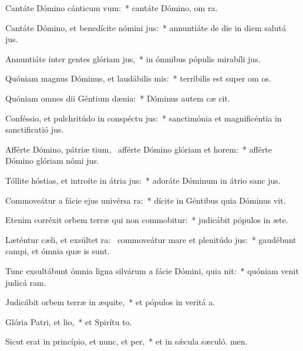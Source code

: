 \item Cantáte Dómino cánticum vum:~* cantáte Dómino, om ra.
\item Cantáte Dómino, et benedícite nómini jus:~* annuntiáte de die in diem salutá jus.
\item Annuntiáte inter gentes glóriam jus,~* in ómnibus pópulis mirabíli jus.
\item Quóniam magnus Dóminus, et laudábilis mis:~* terríbilis est super om os.
\item Quóniam omnes dii Géntium dænia:~* Dóminus autem cæ cit.
\item Conféssio, et pulchritúdo in conspéctu jus:~* sanctimónia et magnificéntia in sanctificatió jus.
\item Afférte Dómino, pátriæ tium,~\pscross{} afférte Dómino glóriam et horem:~* afférte Dómino glóriam nómi jus.
\item Tóllite hóstias, et introíte in átria jus:~* adoráte Dóminum in átrio sanc jus.
\item Commoveátur a fácie ejus univérsa ra:~* dícite in Géntibus quia Dóminus vit.
\item Etenim corréxit orbem terræ qui non commobitur:~* judicábit pópulos in æte.
\item Læténtur cæli, et exsúltet ra:~\pscross{} commoveátur mare et plenitúdo jus:~* gaudébunt campi, et ómnia quæ  is sunt.
\item Tunc exsultábunt ómnia ligna silvárum a fácie Dómini, quia nit:~* quóniam venit judicá ram.
\item Judicábit orbem terræ in æquite,~* et pópulos in veritá a.
\item Glória Patri, et lio,~* et Spirítu to.
\item Sicut erat in princípio, et nunc, et per,~* et in sǽcula sæculó. men.
